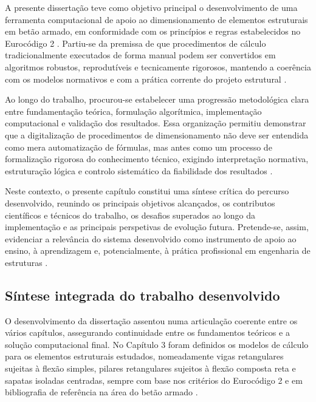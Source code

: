 A presente dissertação teve como objetivo principal o desenvolvimento de uma ferramenta computacional de apoio ao dimensionamento de elementos estruturais em betão armado, em conformidade com os princípios e regras estabelecidos no Eurocódigo 2 \cite{EN1992,Appleton}. Partiu-se da premissa de que procedimentos de cálculo tradicionalmente executados de forma manual podem ser convertidos em algoritmos robustos, reprodutíveis e tecnicamente rigorosos, mantendo a coerência com os modelos normativos e com a prática corrente do projeto estrutural \cite{EN1992,CachimBases}.

Ao longo do trabalho, procurou-se estabelecer uma progressão metodológica clara entre fundamentação teórica, formulação algorítmica, implementação computacional e validação dos resultados. Essa organização permitiu demonstrar que a digitalização de procedimentos de dimensionamento não deve ser entendida como mera automatização de fórmulas, mas antes como um processo de formalização rigorosa do conhecimento técnico, exigindo interpretação normativa, estruturação lógica e controlo sistemático da fiabilidade dos resultados \cite{EN1992,PythonDocs,DjangoDocs}.

Neste contexto, o presente capítulo constitui uma síntese crítica do percurso desenvolvido, reunindo os principais objetivos alcançados, os contributos científicos e técnicos do trabalho, os desafios superados ao longo da implementação e as principais perspetivas de evolução futura. Pretende-se, assim, evidenciar a relevância do sistema desenvolvido como instrumento de apoio ao ensino, à aprendizagem e, potencialmente, à prática profissional em engenharia de estruturas \cite{DjangoDocs,PythonDocs,EN1992}.

\subsection{Síntese integrada do trabalho desenvolvido}

O desenvolvimento da dissertação assentou numa articulação coerente entre os vários capítulos, assegurando continuidade entre os fundamentos teóricos e a solução computacional final. No Capítulo 3 foram definidos os modelos de cálculo para os elementos estruturais estudados, nomeadamente vigas retangulares sujeitas à flexão simples, pilares retangulares sujeitos à flexão composta reta e sapatas isoladas centradas, sempre com base nos critérios do Eurocódigo 2 e em bibliografia de referência na área do betão armado \cite{EN1992,Appleton,AppletonGomes}.

